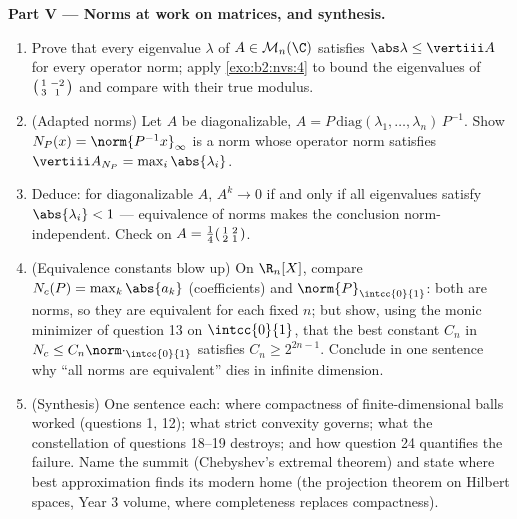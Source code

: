 \begin{problem}
\medskip
\noindent\textbf{Part V --- Norms at work on matrices, and
synthesis.}
\begin{enumerate}[resume]
  \item Prove that every eigenvalue $\lambda$ of $A \in
        \mathcal{M}_n(\C)$ satisfies $\abs\lambda \leq
        \vertiii A$ for every operator norm; apply
        \cref{exo:b2:nvs:4} to bound the eigenvalues of
        $\begin{psmallmatrix}1 & -2\\ 3 & 1\end{psmallmatrix}$
        and compare with their true modulus.
  \item (Adapted norms) Let $A$ be diagonalizable, $A =
        P\,\mathrm{diag}(\lambda_1, \dots, \lambda_n)\,P^{-1}$.
        Show $N_P(x) = \norm{P^{-1}x}_\infty$ is a norm whose
        operator norm satisfies $\vertiii A_{N_P} =
        \max_i\abs{\lambda_i}$.
  \item Deduce: for diagonalizable $A$, $A^k \to 0$ if and only
        if all eigenvalues satisfy $\abs{\lambda_i} < 1$ ---
        equivalence of norms makes the conclusion
        norm-independent. Check on $A =
        \frac14\begin{psmallmatrix}1 & 2\\ 2 &
        1\end{psmallmatrix}$.
  \item (Equivalence constants blow up) On $\R_n[X]$, compare
        $N_c(P) = \max_k \abs{a_k}$ (coefficients) and
        $\norm{P}_{\intcc{0}{1}}$: both are norms, so they are
        equivalent for each fixed $n$; but show, using the monic
        minimizer of question 13 on $\intcc{0}{1}$, that the
        best constant $C_n$ in $N_c \leq
        C_n\norm\cdot_{\intcc{0}{1}}$ satisfies $C_n \geq
        2^{2n-1}$. Conclude in one sentence why ``all norms are
        equivalent'' dies in infinite dimension.
  \item (Synthesis) One sentence each: where compactness of
        finite-dimensional balls worked (questions 1, 12); what
        strict convexity governs; what the constellation of
        questions 18--19 destroys; and how question 24
        quantifies the failure. Name the summit (Chebyshev's
        extremal theorem) and state where best approximation
        finds its modern home (the projection theorem on Hilbert
        spaces, Year 3 volume, where completeness replaces
        compactness).
\end{enumerate}
\end{problem}
